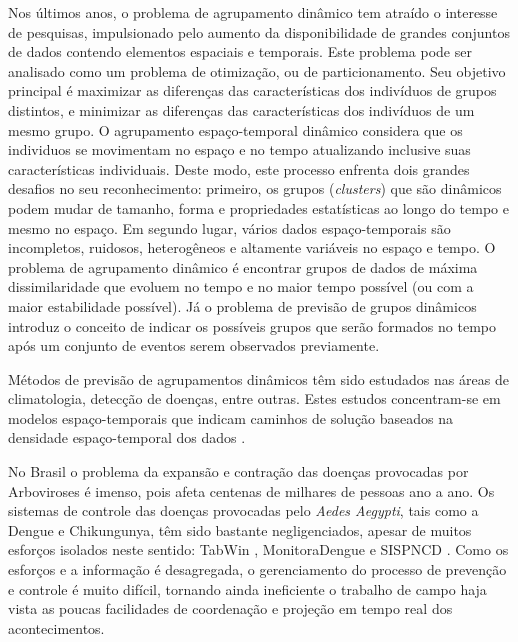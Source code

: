 Nos últimos anos, o problema de agrupamento dinâmico tem atraído o interesse de pesquisas, impulsionado pelo aumento da disponibilidade de grandes conjuntos de dados contendo elementos espaciais e temporais. Este problema pode ser analisado como um problema de otimização, ou de particionamento. Seu objetivo principal é maximizar as diferenças das características dos indivíduos de grupos distintos, e minimizar as diferenças das características dos indivíduos de um mesmo grupo. O agrupamento espaço-temporal dinâmico considera que os individuos se movimentam no espaço e no tempo atualizando inclusive suas características individuais. Deste modo, este processo enfrenta dois grandes desafios no seu reconhecimento: primeiro, os grupos (\textit{clusters}) que são dinâmicos podem mudar de tamanho, forma e propriedades estatísticas ao longo do tempo e mesmo no espaço. Em segundo lugar, vários dados espaço-temporais são incompletos, ruidosos, heterogêneos e altamente variáveis no espaço e tempo. O problema de agrupamento dinâmico é encontrar grupos de dados de máxima dissimilaridade que evoluem no tempo e no maior tempo possível (ou com a maior estabilidade possível). Já o problema de previsão de grupos dinâmicos introduz o conceito de indicar os possíveis grupos que serão formados no tempo após um conjunto de eventos serem observados previamente.

Métodos de previsão de agrupamentos dinâmicos têm sido estudados nas áreas de climatologia, detecção de doenças, entre outras. Estes estudos concentram-se em modelos espaço-temporais que indicam caminhos de solução baseados na densidade espaço-temporal dos dados \cite{gupta:2014}. 

No Brasil o problema da expansão e contração das doenças provocadas por Arboviroses é imenso, pois afeta centenas de milhares de pessoas ano a ano. Os sistemas de controle das doenças provocadas pelo \emph{Aedes Aegypti}, tais como a Dengue e Chikungunya, têm sido bastante negligenciados, apesar de muitos esforços isolados neste sentido: TabWin \cite{tabwin}, MonitoraDengue \cite{monitoraDengue} e \acrshort{SISPNCD} \cite{fad}. Como os esforços e a informação é desagregada, o gerenciamento do processo de prevenção e controle é muito difícil, tornando ainda ineficiente o trabalho de campo haja vista as poucas facilidades de coordenação e projeção em tempo real dos acontecimentos.

